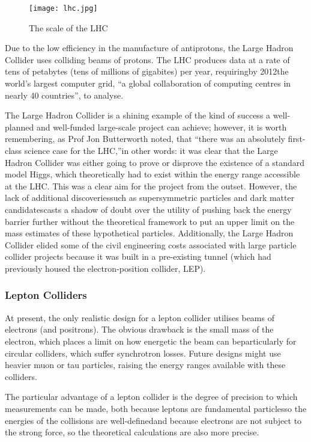 \begin{figure}
\centering
\texttt{[image: lhc.jpg]}
\caption{The scale of the LHC\cite{ATLAS:Gallery:Online}}
\end{figure}

Due to the low efficiency in the manufacture of antiprotons, the Large Hadron Collider uses colliding beams of protons. The LHC produces data at a rate of tens of petabytes (tens of millions of gigabites) per year, requiring\textemdash by 2012\textemdash the world's largest computer grid, ``a global collaboration of computing centres in nearly 40 countries'', to analyse\cite{LHC:ComputingGrid:Online}.

The Large Hadron Collider is a shining example of the kind of success a well-planned and well-funded large-scale project can achieve; however, it is worth remembering, as Prof Jon Butterworth noted, that ``there was an absolutely first-class science case for the LHC,''\textemdash in other words: it was clear that the Large Hadron Collider was either going to prove or disprove the existence of a standard model Higgs, which theoretically had to exist within the energy range accessible at the LHC. This was a clear aim for the project from the outset. However, the lack of additional discoveries\textemdash such as supersymmetric particles and dark matter candidates\textemdash casts a shadow of doubt over the utility of pushing back the energy barrier further without the theoretical framework to put an upper limit on the mass estimates of these hypothetical particles\cite{Butterworth:Interview}. Additionally, the Large Hadron Collider elided some of the civil engineering costs associated with large particle collider projects because it was built in a pre-existing tunnel (which had previously housed the electron-position collider, LEP)\cite{CERN:LEP:Online}.

\subsubsection{Lepton Colliders}
At present, the only realistic design for a lepton collider utilises beams of electrons (and positrons). The obvious drawback is the small mass of the electron, which places a limit on how energetic the beam can be\textemdash particularly for circular colliders, which suffer synchrotron losses. Future designs might use heavier muon or tau particles\cite{Fermi:Muon:Online}, raising the energy ranges available with these colliders.

The particular advantage of a lepton collider is the degree of precision to which measurements can be made, both because leptons are fundamental particles\textemdash so the energies of the collisions are well-defined\textemdash and because electrons are not subject to the strong force, so the theoretical calculations are also more precise\cite{Thorne:Interview}.

